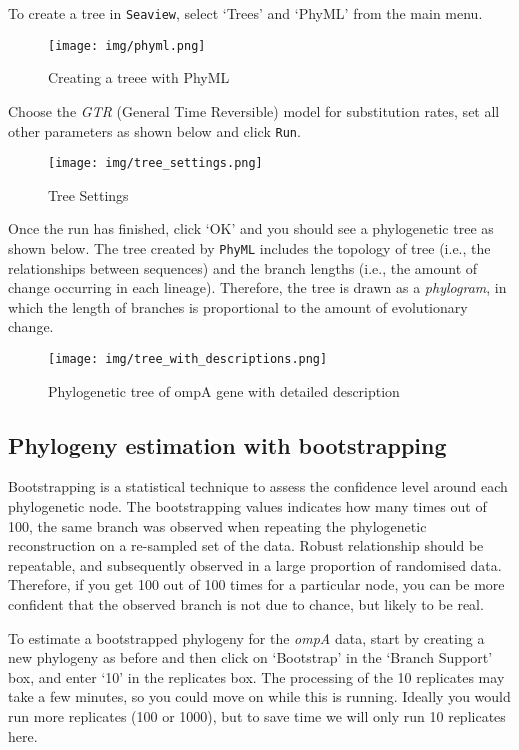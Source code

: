 \documentclass[11pt]{article}
\begin{document}
To create a tree in \texttt{Seaview}, select `Trees' and `PhyML' from
the main menu.

    \begin{figure}
\centering
\texttt{[image: img/phyml.png]}
\caption{Creating a treee with PhyML}
\end{figure}

    Choose the \textit{GTR} (General Time Reversible) model for substitution
rates, set all other parameters as shown below and click \texttt{Run}.

    \begin{figure}
\centering
\texttt{[image: img/tree\_settings.png]}
\caption{Tree Settings}
\end{figure}

    Once the run has finished, click `OK' and you should see a phylogenetic
tree as shown below. The tree created by \texttt{PhyML} includes the
topology of tree (i.e., the relationships between sequences) and the
branch lengths (i.e., the amount of change occurring in each lineage).
Therefore, the tree is drawn as a \textit{phylogram}, in which the length
of branches is proportional to the amount of evolutionary change.

    \begin{figure}
\centering
\texttt{[image: img/tree\_with\_descriptions.png]}
\caption{Phylogenetic tree of ompA gene with detailed description}
\end{figure}

    \hypertarget{phylogeny-estimation-with-bootstrapping}{%
\subsection{Phylogeny estimation with
bootstrapping}\label{phylogeny-estimation-with-bootstrapping}}

Bootstrapping is a statistical technique to assess the confidence level
around each phylogenetic node. The bootstrapping values indicates how
many times out of 100, the same branch was observed when repeating the
phylogenetic reconstruction on a re-sampled set of the data. Robust
relationship should be repeatable, and subsequently observed in a large
proportion of randomised data. Therefore, if you get 100 out of 100
times for a particular node, you can be more confident that the observed
branch is not due to chance, but likely to be real.

To estimate a bootstrapped phylogeny for the \textit{ompA} data, start by
creating a new phylogeny as before and then click on `Bootstrap' in the
`Branch Support' box, and enter `10' in the replicates box. The
processing of the 10 replicates may take a few minutes, so you could
move on while this is running. Ideally you would run more replicates
(100 or 1000), but to save time we will only run 10 replicates here.
\end{document}

